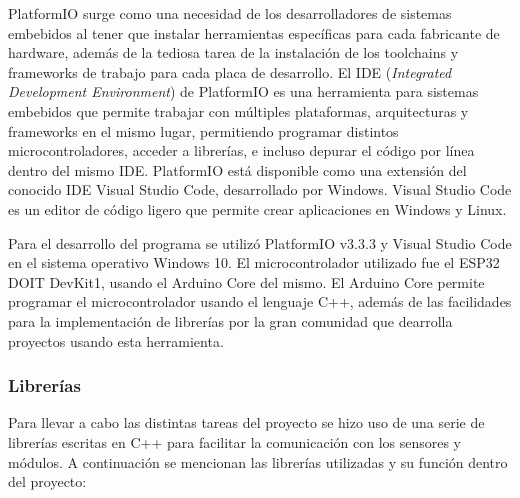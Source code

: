 PlatformIO surge como una necesidad de los desarrolladores de sistemas embebidos al tener que instalar herramientas específicas para cada fabricante de hardware, además de la tediosa tarea de la instalación de los toolchains y frameworks de trabajo para cada placa de desarrollo. El IDE (\textit{Integrated Development Environment}) de PlatformIO es una herramienta para sistemas embebidos que permite trabajar con múltiples plataformas, arquitecturas y frameworks en el mismo lugar, permitiendo programar distintos microcontroladores, acceder a librerías, e incluso depurar el código por línea dentro del mismo IDE. PlatformIO está disponible como una extensión del conocido IDE Visual Studio Code, desarrollado por Windows. Visual Studio Code es un editor de código ligero que permite crear aplicaciones en Windows y Linux.

Para el desarrollo del programa se utilizó PlatformIO v3.3.3 y Visual Studio Code en el sistema operativo Windows 10. El microcontrolador utilizado fue el ESP32 DOIT DevKit1, usando el Arduino Core del mismo. El Arduino Core permite programar el microcontrolador usando el lenguaje C++, además de las facilidades para la implementación de librerías por la gran comunidad que dearrolla proyectos usando esta herramienta.

\subsubsection{Librerías} 

Para llevar a cabo las distintas tareas del proyecto se hizo uso de una serie de librerías escritas en C++ para facilitar la comunicación con los sensores y módulos. A continuación se mencionan las librerías utilizadas y su función dentro del proyecto:

